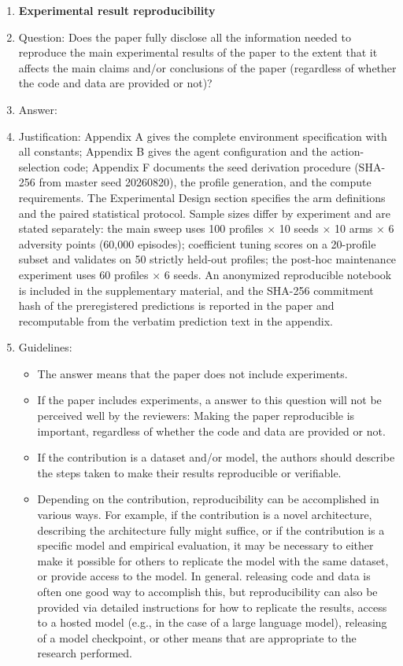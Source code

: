 \begin{enumerate}
    \item {\bf Experimental result reproducibility}
    \item[] Question: Does the paper fully disclose all the information needed to reproduce the main experimental results of the paper to the extent that it affects the main claims and/or conclusions of the paper (regardless of whether the code and data are provided or not)?
    \item[] Answer: \answerYes{}
    \item[] Justification: Appendix A gives the complete environment specification with all constants; Appendix B gives the agent configuration and the action-selection code; Appendix F documents the seed derivation procedure (SHA-256 from master seed 20260820), the profile generation, and the compute requirements. The Experimental Design section specifies the arm definitions and the paired statistical protocol. Sample sizes differ by experiment and are stated separately: the main sweep uses 100 profiles $\times$ 10 seeds $\times$ 10 arms $\times$ 6 adversity points (60,000 episodes); coefficient tuning scores on a 20-profile subset and validates on 50 strictly held-out profiles; the post-hoc maintenance experiment uses 60 profiles $\times$ 6 seeds. An anonymized reproducible notebook is included in the supplementary material, and the SHA-256 commitment hash of the preregistered predictions is reported in the paper and recomputable from the verbatim prediction text in the appendix.
    \item[] Guidelines:
    \begin{itemize}
        \item The answer \answerNA{} means that the paper does not include experiments.
        \item If the paper includes experiments, a \answerNo{} answer to this question will not be perceived well by the reviewers: Making the paper reproducible is important, regardless of whether the code and data are provided or not.
        \item If the contribution is a dataset and\slash or model, the authors should describe the steps taken to make their results reproducible or verifiable. 
        \item Depending on the contribution, reproducibility can be accomplished in various ways. For example, if the contribution is a novel architecture, describing the architecture fully might suffice, or if the contribution is a specific model and empirical evaluation, it may be necessary to either make it possible for others to replicate the model with the same dataset, or provide access to the model. In general. releasing code and data is often one good way to accomplish this, but reproducibility can also be provided via detailed instructions for how to replicate the results, access to a hosted model (e.g., in the case of a large language model), releasing of a model checkpoint, or other means that are appropriate to the research performed.

\end{itemize}
\end{enumerate}
